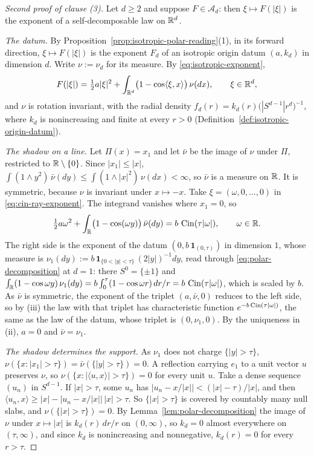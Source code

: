 \begin{proof}[Second proof of clause (3)]
Let $d \ge 2$ and suppose $F \in \mathcal{A}_d$: then $\xi \mapsto F(|\xi|)$ is the exponent of a
self-decomposable law on $\mathbb{R}^d$.

\emph{The datum.} By Proposition~\ref{prop:isotropic-polar-reading}(1), in its forward direction,
$\xi \mapsto F(|\xi|)$ is the exponent $F_d$ of an isotropic origin datum $(a,k_d)$ in dimension
$d$. Write $\nu := \nu_d$ for its \Levy{} measure. By \ref{eq:isotropic-exponent},
\begin{equation}\label{eq:cin-ray-exponent}
  F(|\xi|) = \tfrac12 a|\xi|^2
   + \int_{\mathbb{R}^d}\bigl(1 - \cos\langle\xi,x\rangle\bigr)\,\nu(dx), \qquad \xi \in \mathbb{R}^d ,
\end{equation}
and $\nu$ is rotation invariant, with the radial density
$f_d(r) = k_d(r)\bigl(|S^{d-1}|r^d\bigr)^{-1}$, where $k_d$ is nonincreasing and finite at every
$r > 0$ (Definition~\ref{def:isotropic-origin-datum}).

\emph{The shadow on a line.} Let $\Pi(x) = x_1$ and let $\bar\nu$ be the image of $\nu$ under
$\Pi$, restricted to $\mathbb{R} \setminus \{0\}$. Since $|x_1| \le |x|$,
$\int(1 \wedge y^2)\,\bar\nu(dy) \le \int(1 \wedge |x|^2)\,\nu(dx) < \infty$, so $\bar\nu$ is a
\Levy{} measure on $\mathbb{R}$. It is symmetric, because $\nu$ is invariant under $x \mapsto -x$. Take
$\xi = (\omega,0,\dots,0)$ in \ref{eq:cin-ray-exponent}. The integrand vanishes where $x_1 = 0$,
so
\[
  \tfrac12 a\omega^2 + \int_{\mathbb{R}}\bigl(1 - \cos(\omega y)\bigr)\,\bar\nu(dy) = b\,\operatorname{Cin}(\tau|\omega|),
  \qquad \omega \in \mathbb{R} .
\]
The right side is the exponent of the datum $(0, b\,\mathbf{1}_{(0,\tau)})$ in dimension $1$, whose
\Levy{} measure is $\nu_1(dy) := b\,\mathbf{1}_{\{0<|y|<\tau\}}\,(2|y|)^{-1}dy$, read through
\ref{eq:polar-decomposition} at $d = 1$: there $S^0 = \{\pm1\}$ and
$\int_{\mathbb{R}}(1 - \cos\omega y)\,\nu_1(dy) = b\int_0^\tau(1-\cos\omega r)\,dr/r = b\,\operatorname{Cin}(\tau|\omega|)$,
which is  scaled by $b$. As $\bar\nu$ is symmetric, the exponent of the triplet
$(a,\bar\nu,0)$ reduces to the left side, so by (iii) the law with that triplet has
characteristic function $e^{-b\operatorname{Cin}(\tau|\omega|)}$, the same as the law of the datum, whose triplet
is $(0,\nu_1,0)$. By the uniqueness in (ii), $a = 0$ and $\bar\nu = \nu_1$.

\emph{The shadow determines the support.} As $\nu_1$ does not charge $\{|y| > \tau\}$,
$\nu(\{x : |x_1| > \tau\}) = \bar\nu(\{|y| > \tau\}) = 0$. A reflection carrying $e_1$ to a unit
vector $u$ preserves $\nu$, so $\nu(\{x : |\langle u,x\rangle| > \tau\}) = 0$ for every unit $u$.
Take a dense sequence $(u_n)$ in $S^{d-1}$. If $|x| > \tau$, some $u_n$ has
$|u_n - x/|x|| < (|x|-\tau)/|x|$, and then $\langle u_n,x\rangle \ge |x| - |u_n - x/|x||\,|x| >
\tau$. So $\{|x| > \tau\}$ is covered by countably many null slabs, and
$\nu(\{|x| > \tau\}) = 0$. By Lemma~\ref{lem:polar-decomposition} the image of $\nu$ under
$x \mapsto |x|$ is $k_d(r)\,dr/r$ on $(0,\infty)$, so $k_d = 0$ almost everywhere on
$(\tau,\infty)$, and since $k_d$ is nonincreasing and nonnegative, $k_d(r) = 0$ for every
$r > \tau$.


\end{proof}
